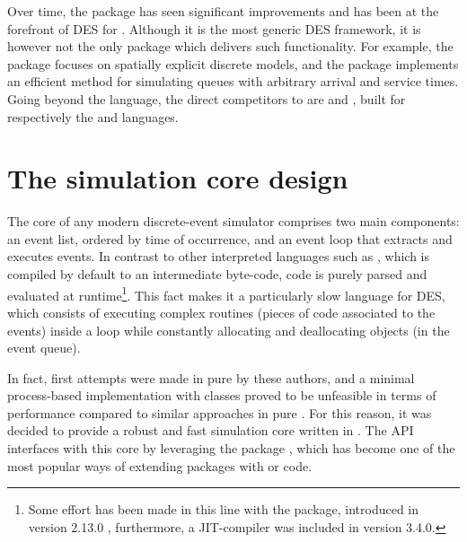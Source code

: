 \documentclass[
  nojss]{jss}
\begin{document}
Over time, the  package has seen significant improvements
and has been at the forefront of DES for . Although it is
the most generic DES framework, it is however not the only 
package which delivers such functionality. For example, the 
package \citep{CRAN:SpaDES} focuses on spatially explicit discrete
models, and the  package
\citep{CRAN:queuecomputer, arxiv:queuecomputer} implements an efficient
method for simulating queues with arbitrary arrival and service times.
Going beyond the  language, the direct competitors to
 are  \citep{SimPy} and 
\citep{GitHub:SimJulia}, built for respectively the 
and  languages.

\hypertarget{the-simulation-core-design}{%
\section{The simulation core design}\label{the-simulation-core-design}}

The core of any modern discrete-event simulator comprises two main
components: an event list, ordered by time of occurrence, and an event
loop that extracts and executes events. In contrast to other interpreted
languages such as , which is compiled by default to an
intermediate byte-code,  code is purely parsed and evaluated
at runtime\footnote{Some effort has been made in this line with the
   package, introduced in  version 2.13.0
  \citep{R:compiler}, furthermore, a JIT-compiler was included in
   version 3.4.0.}. This fact makes it a particularly slow
language for DES, which consists of executing complex routines (pieces
of code associated to the events) inside a loop while constantly
allocating and deallocating objects (in the event queue).

In fact, first attempts were made in pure  by these authors,
and a minimal process-based implementation with  classes
\citep{CRAN:R6} proved to be unfeasible in terms of performance compared
to similar approaches in pure . For this reason, it was
decided to provide a robust and fast simulation core written in
. The  API interfaces with this 
core by leveraging the  package
\citep{Eddelbuettel:2011:Rcpp, Eddelbuettel:2013:Rcpp}, which has become
one of the most popular ways of extending  packages with
 or  code.
\end{document}
